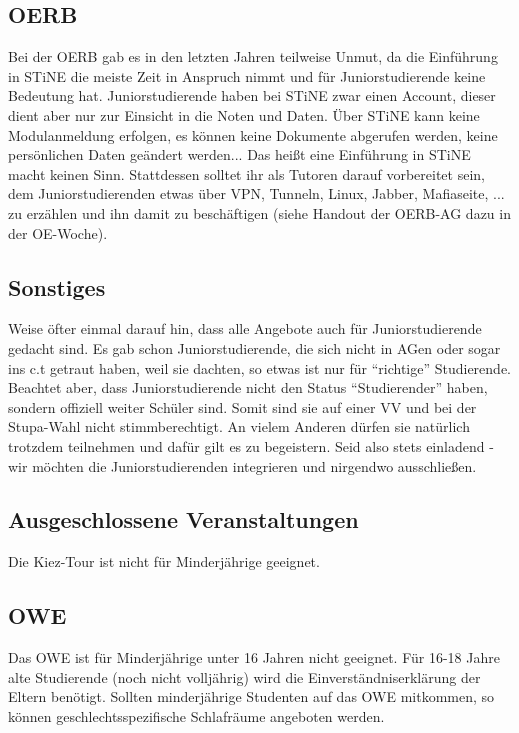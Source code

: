 \documentclass[a4paper,11pt]{scrartcl} %
\begin{document}
	\subsection{OERB}

Bei der OERB gab es in den letzten Jahren teilweise Unmut, da die Einführung in STiNE die meiste Zeit in Anspruch nimmt und für Juniorstudierende keine Bedeutung hat. Juniorstudierende haben bei STiNE zwar einen Account, dieser dient aber nur zur Einsicht in die Noten und Daten. Über STiNE kann keine Modulanmeldung erfolgen, es können keine Dokumente abgerufen werden, keine persönlichen Daten geändert werden... Das heißt eine Einführung in STiNE macht keinen Sinn. Stattdessen solltet ihr als Tutoren darauf vorbereitet sein, dem Juniorstudierenden etwas über VPN, Tunneln, Linux, Jabber, Mafiaseite, ... zu erzählen und ihn damit zu beschäftigen (siehe Handout der OERB-AG dazu in der OE-Woche).

\subsection{Sonstiges} %

Weise öfter einmal darauf hin, dass alle Angebote auch für Juniorstudierende gedacht sind. Es gab schon Juniorstudierende, die sich nicht in AGen oder sogar ins c.t getraut haben, weil sie dachten, so etwas ist nur für "`richtige"' Studierende. Beachtet aber, dass Juniorstudierende nicht den Status "`Studierender"' haben, sondern offiziell weiter Schüler sind. Somit sind sie auf einer VV und bei der Stupa-Wahl nicht stimmberechtigt. An vielem Anderen dürfen sie natürlich trotzdem teilnehmen und dafür gilt es zu begeistern. Seid also stets einladend - wir möchten die Juniorstudierenden integrieren und nirgendwo ausschließen.

	\subsection{Ausgeschlossene Veranstaltungen}
	
Die Kiez-Tour ist nicht für Minderjährige geeignet.

	\subsection{OWE}
	
Das OWE ist für Minderjährige unter 16 Jahren nicht geeignet. Für 16-18 Jahre alte Studierende (noch nicht volljährig) wird die Einverständniserklärung der Eltern benötigt. Sollten minderjährige Studenten auf das OWE mitkommen, so können geschlechtsspezifische Schlafräume angeboten werden.
\end{document}
